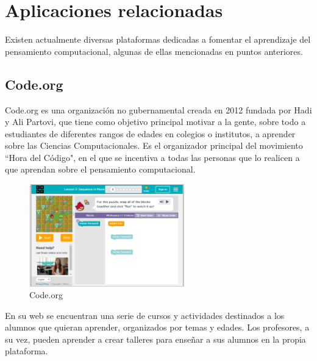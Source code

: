 
\section{Aplicaciones relacionadas}
\label{2:sec:2}

Existen actualmente diversas plataformas dedicadas a fomentar el aprendizaje del pensamiento computacional, algunas de ellas mencionadas en puntos anteriores.


\subsection{Code.org}
\label{2:sec:1}

Code.org es una organización no gubernamental creada en 2012 fundada por Hadi y Ali Partovi, que tiene como objetivo principal motivar a la gente, sobre todo a estudiantes de diferentes rangos de edades en colegios o institutos, a aprender sobre las Ciencias Computacionales. Es el organizador principal del movimiento ``Hora del Código", en el que se incentiva a todas las personas que lo realicen a que aprendan sobre el
pensamiento computacional.

\begin{figure}[!th]
\begin{center}
\includegraphics[width=0.6\textwidth]{images/captura_code.eps}
\caption{Code.org}
\label{fig:1}
\end{center}
\end{figure}

En su web se encuentran una serie de cursos y actividades destinados a los alumnos que quieran aprender, organizados por temas y edades. Los profesores, a su vez, pueden aprender a crear talleres para enseñar a sus alumnos en la propia plataforma.

